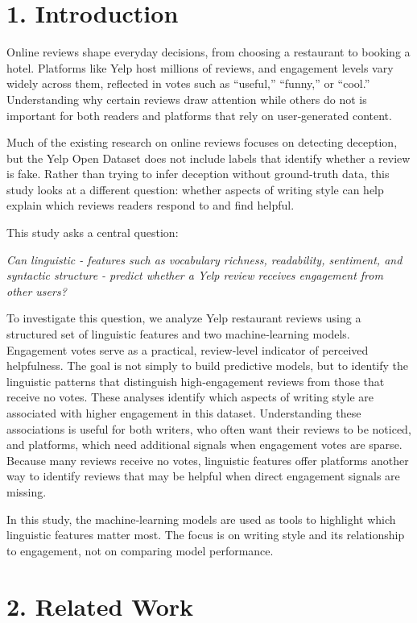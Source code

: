 \hypertarget{introduction}{%
\section{1. Introduction}\label{introduction}}

Online reviews shape everyday decisions, from choosing a restaurant to
booking a hotel. Platforms like Yelp host millions of reviews, and
engagement levels vary widely across them, reflected in votes such as
``useful,'' ``funny,'' or ``cool.'' Understanding why certain reviews
draw attention while others do not is important for both readers and
platforms that rely on user‑generated content.

Much of the existing research on online reviews focuses on detecting
deception, but the Yelp Open Dataset does not include labels that
identify whether a review is fake. Rather than trying to infer deception
without ground‑truth data, this study looks at a different question:
whether aspects of writing style can help explain which reviews readers
respond to and find helpful.

This study asks a central question:

\emph{Can linguistic - features such as vocabulary richness,
readability, sentiment, and syntactic structure - predict whether a Yelp
review receives engagement from other users?}

To investigate this question, we analyze Yelp restaurant reviews using a
structured set of linguistic features and two machine‑learning models.
Engagement votes serve as a practical, review‑level indicator of
perceived helpfulness. The goal is not simply to build predictive
models, but to identify the linguistic patterns that distinguish
high‑engagement reviews from those that receive no votes. These analyses
identify which aspects of writing style are associated with higher
engagement in this dataset. Understanding these associations is useful
for both writers, who often want their reviews to be noticed, and
platforms, which need additional signals when engagement votes are
sparse. Because many reviews receive no votes, linguistic features offer
platforms another way to identify reviews that may be helpful when
direct engagement signals are missing.

In this study, the machine‑learning models are used as tools to
highlight which linguistic features matter most. The focus is on writing
style and its relationship to engagement, not on comparing model
performance.

\hypertarget{related-work}{%
\section{2. Related Work}\label{related-work}}

